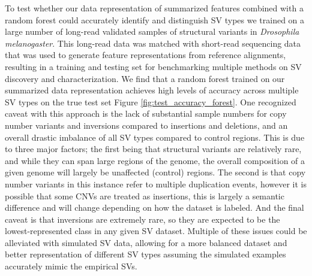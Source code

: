 To test whether our data representation of summarized features combined with a random forest could accurately identify and distinguish SV types we trained on a large number of long-read validated samples of structural variants in \textit{Drosophila melanogaster}. This long-read data was matched with short-read sequencing data that was used to generate feature representations from reference alignments, resulting in a training and testing set for benchmarking multiple methods on SV discovery and characterization. We find that a random forest trained on our summarized data representation achieves high levels of accuracy across multiple SV types on the true test set Figure \ref{fig:test_accuracy_forest}. One recognized caveat with this approach is the lack of substantial sample numbers for copy number variants and inversions compared to insertions and deletions, and an overall drastic imbalance of all SV types compared to control regions. This is due to three major factors; the first being that structural variants are relatively rare, and while they can span large regions of the genome, the overall composition of a given genome will largely be unaffected (control) regions. The second is that copy number variants in this instance refer to multiple duplication events, however it is possible that some CNVs are treated as insertions, this is largely a semantic difference and will change depending on how the dataset is labeled. And the final caveat is that inversions are extremely rare, so they are expected to be the lowest-represented class in any given SV dataset. Multiple of these issues could be alleviated with simulated SV data, allowing for a more balanced dataset and better representation of different SV types assuming the simulated examples accurately mimic the empirical SVs.


